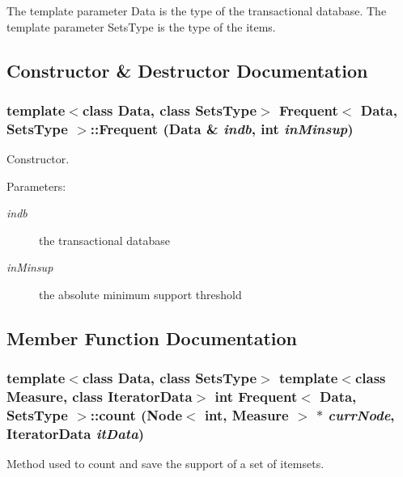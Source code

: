 The template parameter Data is the type of the transactional database. The template parameter Sets\-Type is the type of the items. 



\subsection{Constructor \& Destructor Documentation}
\subsubsection{\setlength{\rightskip}{0pt plus 5cm}template$<$class Data, class Sets\-Type$>$ {\bf Frequent}$<$ Data, Sets\-Type $>$::{\bf Frequent} (Data \& {\em indb}, int {\em in\-Minsup})\hspace{0.3cm}{\tt  [inline]}}\label{class_frequent_d4786ab80688426419495d0d8ff3ea47}


Constructor. 

\begin{Desc}
\item[Parameters:]
\begin{description}
\item[{\em indb}]the transactional database \item[{\em in\-Minsup}]the absolute minimum support threshold \end{description}
\end{Desc}


\subsection{Member Function Documentation}
\subsubsection{\setlength{\rightskip}{0pt plus 5cm}template$<$class Data, class Sets\-Type$>$ template$<$class Measure, class Iterator\-Data$>$ int {\bf Frequent}$<$ Data, Sets\-Type $>$::count ({\bf Node}$<$ int, Measure $>$ $\ast$ {\em curr\-Node}, Iterator\-Data {\em it\-Data})\hspace{0.3cm}{\tt  [protected]}}\label{class_frequent_50001a78dd15b91872285556ba7dfbe4}


Method used to count and save the support of a set of itemsets. 

